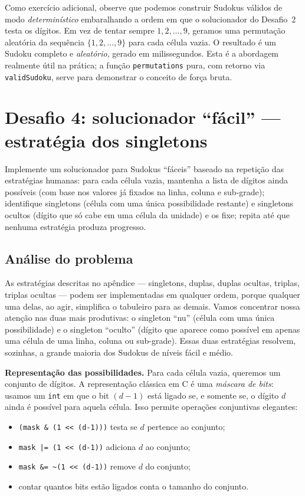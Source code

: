 \documentclass[11pt,a4paper,oneside]{report}
\newcommand{\codigo}[1]{\texttt{\color{deitelblue}#1}}
\begin{document}
Como exercício adicional, observe que podemos construir Sudokus válidos
de modo \emph{determinístico} embaralhando a ordem em que o solucionador
do Desafio~2 testa os dígitos. Em vez de tentar sempre $1, 2, \ldots, 9$,
geramos uma permutação aleatória da sequência $\{1, 2, \ldots, 9\}$ para
cada célula vazia. O resultado é um Sudoku completo e \emph{aleatório},
gerado em milissegundos. Esta é a abordagem realmente útil na prática;
a função \codigo{permutations} pura, com retorno via \codigo{validSudoku},
serve para demonstrar o conceito de força bruta.

\section{Desafio 4: solucionador ``fácil'' --- estratégia dos singletons}

\begin{enunciado}
Implemente um solucionador para Sudokus ``fáceis'' baseado na repetição
das estratégias humanas: para cada célula vazia, mantenha a lista de
dígitos ainda possíveis (com base nos valores já fixados na linha, coluna
e sub-grade); identifique singletons (célula com uma única possibilidade
restante) e singletons ocultos (dígito que só cabe em uma célula da unidade)
e os fixe; repita até que nenhuma estratégia produza progresso.
\end{enunciado}

\subsection{Análise do problema}

As estratégias descritas no apêndice --- singletons, duplas, duplas ocultas,
triplas, triplas ocultas --- podem ser implementadas em qualquer ordem,
porque qualquer uma delas, ao agir, simplifica o tabuleiro para as demais.
Vamos concentrar nossa atenção nas duas mais produtivas: o singleton
``nu'' (célula com uma única possibilidade) e o singleton ``oculto''
(dígito que aparece como possível em apenas uma célula de uma linha, coluna
ou sub-grade). Essas duas estratégias resolvem, sozinhas, a grande maioria
dos Sudokus de níveis fácil e médio.

\textbf{Representação das possibilidades.} Para cada célula vazia, queremos
um conjunto de dígitos. A representação clássica em C é uma \emph{máscara
de bits}: usamos um \codigo{int} em que o bit $(d - 1)$ está ligado se, e
somente se, o dígito $d$ ainda é possível para aquela célula. Isso permite
operações conjuntivas elegantes:
\begin{itemize}
    \item \codigo{(mask \& (1 << (d-1)))} testa se $d$ pertence ao conjunto;
    \item \codigo{mask |= (1 << (d-1))} adiciona $d$ ao conjunto;
    \item \codigo{mask \&= \~{}(1 << (d-1))} remove $d$ do conjunto;
    \item contar quantos bits estão ligados conta o tamanho do conjunto.
\end{itemize}
\end{document}

